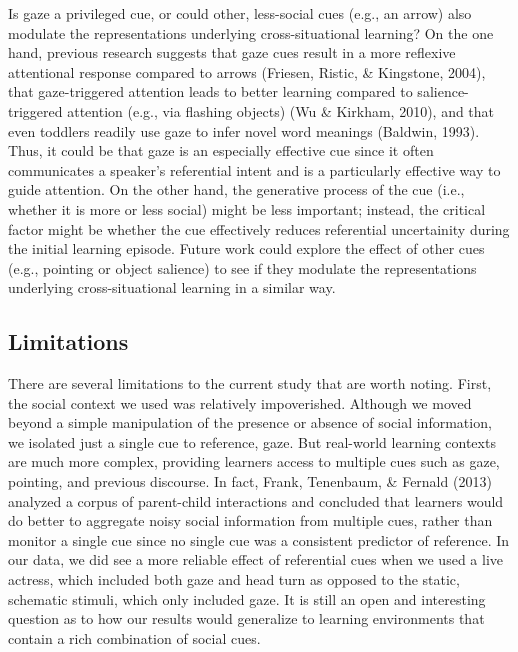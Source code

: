 \documentclass[authoryear, review]{elsarticle}
\begin{document}
Is gaze a privileged cue, or could other, less-social cues (e.g., an
arrow) also modulate the representations underlying cross-situational
learning? On the one hand, previous research suggests that gaze cues
result in a more reflexive attentional response compared to arrows
(Friesen, Ristic, \& Kingstone, 2004), that gaze-triggered attention
leads to better learning compared to salience-triggered attention (e.g.,
via flashing objects) (Wu \& Kirkham, 2010), and that even toddlers
readily use gaze to infer novel word meanings (Baldwin, 1993). Thus, it
could be that gaze is an especially effective cue since it often
communicates a speaker's referential intent and is a particularly
effective way to guide attention. On the other hand, the generative
process of the cue (i.e., whether it is more or less social) might be
less important; instead, the critical factor might be whether the cue
effectively reduces referential uncertainity during the initial learning
episode. Future work could explore the effect of other cues (e.g.,
pointing or object salience) to see if they modulate the representations
underlying cross-situational learning in a similar way.

\subsection{Limitations}\label{limitations}

There are several limitations to the current study that are worth
noting. First, the social context we used was relatively impoverished.
Although we moved beyond a simple manipulation of the presence or
absence of social information, we isolated just a single cue to
reference, gaze. But real-world learning contexts are much more complex,
providing learners access to multiple cues such as gaze, pointing, and
previous discourse. In fact, Frank, Tenenbaum, \& Fernald (2013)
analyzed a corpus of parent-child interactions and concluded that
learners would do better to aggregate noisy social information from
multiple cues, rather than monitor a single cue since no single cue was
a consistent predictor of reference. In our data, we did see a more
reliable effect of referential cues when we used a live actress, which
included both gaze and head turn as opposed to the static, schematic
stimuli, which only included gaze. It is still an open and interesting
question as to how our results would generalize to learning environments
that contain a rich combination of social cues.
\end{document}
